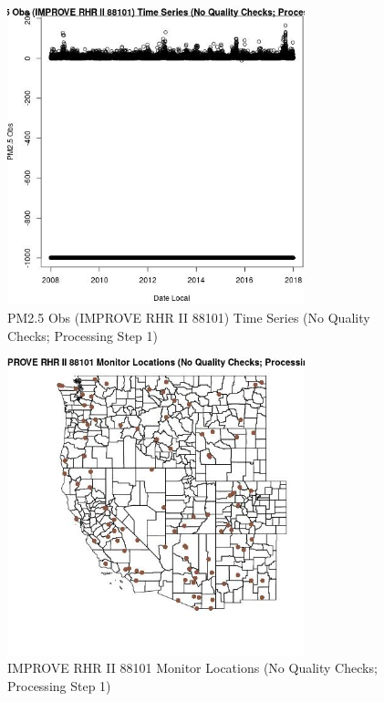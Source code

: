 
\begin{figure} 
\centering  
\includegraphics[width=0.77\textwidth]{Code_Outputs/PM25Source5TSstep1_PM25_ObsvDate_Local.jpg} 
\caption{\label{fig:PM25Source5TSstep1PM25_ObsvDate_Local}PM2.5 Obs (IMPROVE RHR II 88101) Time Series (No Quality Checks; Processing Step 1)} 
\end{figure} 
 

\begin{figure} 
\centering  
\includegraphics[width=0.77\textwidth]{Code_Outputs/PM25Source5TSstep1_MapIMPRHRII88101Locations.jpg} 
\caption{\label{fig:PM25Source5TSstep1MapIMPRHRII88101Locations}IMPROVE RHR II 88101 Monitor Locations (No Quality Checks; Processing Step 1)} 
\end{figure} 
 
